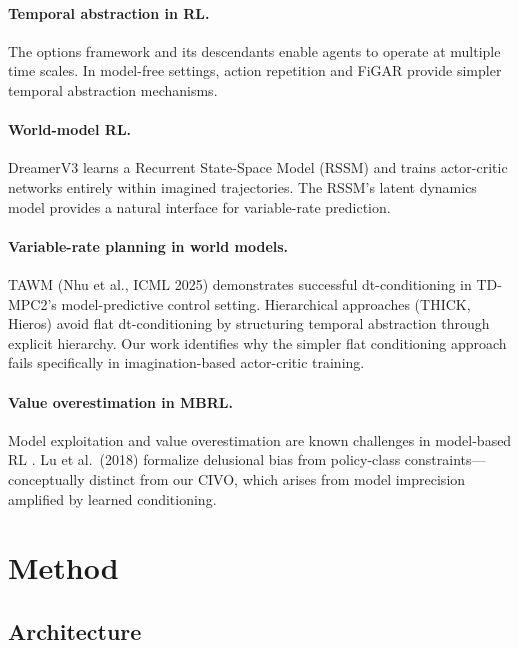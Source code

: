 \documentclass[10pt,letterpaper]{article}
\begin{document}
\paragraph{Temporal abstraction in RL.}
The options framework \cite{sutton1999options} and its descendants \cite{bacon2017optioncritic,vezhnevets2017feudal} enable agents to operate at multiple time scales. In model-free settings, action repetition \cite{lakshminarayanan2017dynamic} and FiGAR \cite{sharma2017learning} provide simpler temporal abstraction mechanisms.

\paragraph{World-model RL.}
DreamerV3 \cite{hafner2023dreamerv3} learns a Recurrent State-Space Model (RSSM) and trains actor-critic networks entirely within imagined trajectories. The RSSM's latent dynamics model provides a natural interface for variable-rate prediction.

\paragraph{Variable-rate planning in world models.}
TAWM (Nhu et al., ICML 2025) demonstrates successful dt-conditioning in TD-MPC2's model-predictive control setting. Hierarchical approaches (THICK, Hieros) avoid flat dt-conditioning by structuring temporal abstraction through explicit hierarchy. Our work identifies why the simpler flat conditioning approach fails specifically in imagination-based actor-critic training.

\paragraph{Value overestimation in MBRL.}
Model exploitation and value overestimation are known challenges in model-based RL \cite{janner2019mbpo}. Lu et al.\ (2018) formalize delusional bias from policy-class constraints---conceptually distinct from our CIVO, which arises from model imprecision amplified by learned conditioning.

\section{Method}

\subsection{Architecture}
\end{document}
